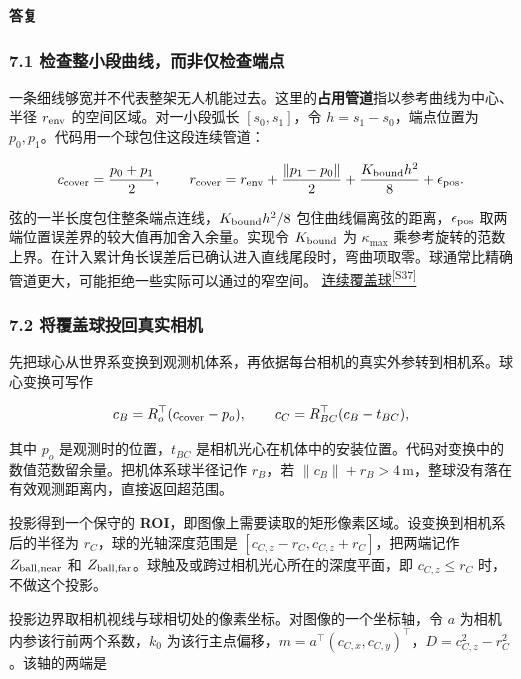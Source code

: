 \documentclass[11pt,a4paper]{article}
\numberwithin{equation}{topic}
\newenvironment{reply}{%
  \par\noindent\textcolor{replycolor}{\sffamily\bfseries 答复}\par\nobreak\ignorespaces
}{\par\medskip}
\newcommand{\sourceref}[2]{\hyperlink{source-#1}{#2\textsuperscript{[#1]}}}
\begin{document}
\begin{reply}
\subsubsection*{7.1 检查整小段曲线，而非仅检查端点}

一条细线够宽并不代表整架无人机能过去。这里的\textbf{占用管道}指以参考曲线为中心、半径 \(r_{\rm env}\) 的空间区域。对一小段弧长 \([s_0,s_1]\)，令 \(h=s_1-s_0\)，端点位置为 \(p_0,p_1\)。代码用一个球包住这段连续管道：

\begin{equation}
\label{eq:ball}
c_{\rm cover}=\frac{p_0+p_1}{2},\qquad
r_{\rm cover}
=r_{\rm env}+\frac{\|p_1-p_0\|}{2}
+\frac{K_{\rm bound}h^2}{8}+\epsilon_{\rm pos}.
\end{equation}

弦的一半长度包住整条端点连线，\(K_{\rm bound}h^2/8\) 包住曲线偏离弦的距离，\(\epsilon_{\rm pos}\) 取两端位置误差界的较大值再加舍入余量。实现令 \(K_{\rm bound}\) 为 \(\kappa_{\max}\) 乘参考旋转的范数上界。在计入累计角长误差后已确认进入直线尾段时，弯曲项取零。球通常比精确管道更大，可能拒绝一些实际可以通过的窄空间。 \sourceref{S37}{连续覆盖球}

\subsubsection*{7.2 将覆盖球投回真实相机}

先把球心从世界系变换到观测机体系，再依据每台相机的真实外参转到相机系。球心变换可写作

\begin{equation}
\label{eq:frames}
c_B=R_o^\top(c_{\rm cover}-p_o),\qquad
c_C=R_{BC}^\top(c_B-t_{BC}),
\end{equation}

其中 \(p_o\) 是观测时的位置，\(t_{BC}\) 是相机光心在机体中的安装位置。代码对变换中的数值范数留余量。把机体系球半径记作 \(r_B\)，若 \(\|c_B\|+r_B>4\,\mathrm m\)，整球没有落在有效观测距离内，直接返回超范围。

投影得到一个保守的 \textbf{ROI}，即图像上需要读取的矩形像素区域。设变换到相机系后的半径为 \(r_C\)，球的光轴深度范围是 \([c_{C,z}-r_C,c_{C,z}+r_C]\)，把两端记作 \(Z_{\rm ball,near}\) 和 \(Z_{\rm ball,far}\)。球触及或跨过相机光心所在的深度平面，即 \(c_{C,z}\le r_C\) 时，不做这个投影。

投影边界取相机视线与球相切处的像素坐标。对图像的一个坐标轴，令 \(a\) 为相机内参该行前两个系数，\(k_0\) 为该行主点偏移，\(m=a^\top(c_{C,x},c_{C,y})^\top\)，\(D=c_{C,z}^2-r_C^2\)。该轴的两端是


\end{reply}
\end{document}
